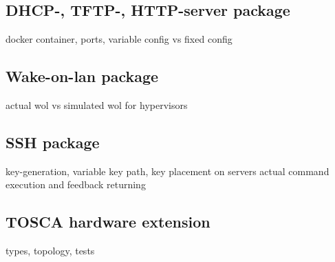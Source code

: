 \subsection{DHCP-, TFTP-, HTTP-server package}
docker container, ports, variable config vs fixed config

\subsection{Wake-on-lan package}
actual wol vs simulated wol for hypervisors

\subsection{SSH package}
key-generation, variable key path, key placement on servers
\newline
actual command execution and feedback returning

\subsection{TOSCA hardware extension}
types, topology, tests
